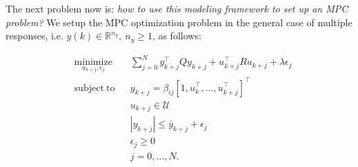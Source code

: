 


\textcolor[rgb]{0,0,1}{The next problem now is: \emph{how to use this modeling framework to set up an MPC problem?} We setup the MPC optimization problem in the general case of multiple responses, i.e. $y(k)\in\mathbb{R}^{n_y},\ n_y\geq 1$, as follows:}

\begin{problem}\label{P:dpcrt}
	\begin{equation}
		\begin{aligned}
		& \underset{u_{k+j},\epsilon_j}{\mathrm{minimize}} & & \sum_{j=0}^{N} y^\top_{k+j} Q y_{k+j} + u^\top_{k+j} R u_{k+j} + \lambda\epsilon_j \\
		& \mathrm{subject\ to }                 & & y_{k+j}     =   \beta_{ij} [1,u^\top_{k},\ldots,u^\top_{k+j} ]^\top                   \\
		&                                       & & u_{k+j}    \in  \mathcal{U}                                                        \\
		&                                       & & |y_{k+j}|  \leq \bar{y}_{k+j} + \epsilon_j 										   \\
		&                                       & & \epsilon_j \geq  0							                                       \\
		&                                       & & j           =    0,\ldots,N.            									       \\
		\end{aligned}
		\label{E:dpcrt}
	\end{equation}
\end{problem}

